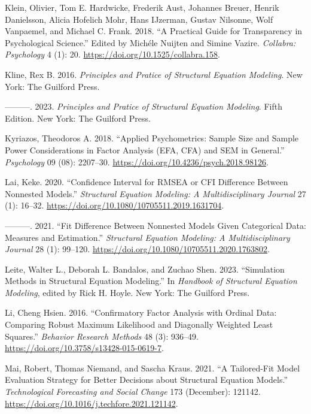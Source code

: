 \documentclass[
  a4paper,
]{article}
\newlength{\cslhangindent}
\newenvironment{CSLReferences}[2] %
 {\begin{list}{}{%
  \setlength{\itemindent}{0pt}
  \setlength{\leftmargin}{0pt}
  \setlength{\parsep}{0pt}
  \ifodd #1
   \setlength{\leftmargin}{\cslhangindent}
   \setlength{\itemindent}{-1\cslhangindent}
  \fi
  \setlength{\itemsep}{#2\baselineskip}}}
 {\end{list}}
\begin{document}
\begin{CSLReferences}{1}{0}
Klein, Olivier, Tom E. Hardwicke, Frederik Aust, Johannes Breuer, Henrik
Danielsson, Alicia Hofelich Mohr, Hans IJzerman, Gustav Nilsonne, Wolf
Vanpaemel, and Michael C. Frank. 2018. {``A {Practical Guide} for
{Transparency} in {Psychological Science}.''} Edited by Michéle Nuijten
and Simine Vazire. \emph{Collabra: Psychology} 4 (1): 20.
\url{https://doi.org/10.1525/collabra.158}.

Kline, Rex B. 2016. \emph{Principles and {Pratice} of {Structural
Equation Modeling}}. New York: The Guilford Press.

---------. 2023. \emph{Principles and {Pratice} of {Structural Equation
Modeling}}. Fifth Edition. New York: The Guilford Press.

Kyriazos, Theodoros A. 2018. {``Applied {Psychometrics}: {Sample Size}
and {Sample Power Considerations} in {Factor Analysis} ({EFA}, {CFA})
and {SEM} in {General}.''} \emph{Psychology} 09 (08): 2207--30.
\url{https://doi.org/10.4236/psych.2018.98126}.

Lai, Keke. 2020. {``Confidence {Interval} for {RMSEA} or {CFI Difference
Between Nonnested Models}.''} \emph{Structural Equation Modeling: A
Multidisciplinary Journal} 27 (1): 16--32.
\url{https://doi.org/10.1080/10705511.2019.1631704}.

---------. 2021. {``Fit {Difference Between Nonnested Models Given
Categorical Data}: {Measures} and {Estimation}.''} \emph{Structural
Equation Modeling: A Multidisciplinary Journal} 28 (1): 99--120.
\url{https://doi.org/10.1080/10705511.2020.1763802}.

Leite, Walter L., Deborah L. Bandalos, and Zuchao Shen. 2023.
{``Simulation {Methods} in {Structural Equation Modeling}.''} In
\emph{Handbook of {Structural Equation Modeling}}, edited by Rick H.
Hoyle. New York: The Guilford Press.

Li, Cheng Hsien. 2016. {``Confirmatory Factor Analysis with Ordinal
Data: {Comparing} Robust Maximum Likelihood and Diagonally Weighted
Least Squares.''} \emph{Behavior Research Methods} 48 (3): 936--49.
\url{https://doi.org/10.3758/s13428-015-0619-7}.

Mai, Robert, Thomas Niemand, and Sascha Kraus. 2021. {``A Tailored-Fit
Model Evaluation Strategy for Better Decisions about Structural Equation
Models.''} \emph{Technological Forecasting and Social Change} 173
(December): 121142.
\url{https://doi.org/10.1016/j.techfore.2021.121142}.


\end{CSLReferences}
\end{document}
